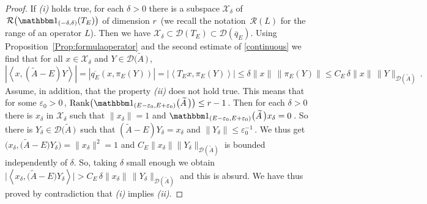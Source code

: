 \documentclass[12pt,reqno]{amsart}
\newcommand{\innerproduct}[2]{\left\langle #1, #2 \right\rangle}
\renewcommand{\(}{\left(}
\renewcommand{\)}{\right)}
\begin{document}
\begin{proof}
If {\it (i)} holds true, for each $\delta>0$ there is a subspace $\mathcal X_\delta$ of $\,{\mathcal R}\big({\mathbbm 1}_{(-\delta,\delta)}(T_E)\big)$ of dimension $r\,$ (we recall the notation $\,{\mathcal R}(L)$ for the range of an operator $L$). Then we have $\mathcal X_\delta\subset \mathcal D(T_E)\subset \mathcal D(\overline{q}_E)$. Using Proposition~\ref{Prop:formulaoperator} and the second estimate of \eqref{continuous} we find that for all $x\in \mathcal X_\delta$ and $Y\in \mathcal D\big(\widetilde A\,\big)\,$,
\[ \left|\innerproduct{x}{(\widetilde A-E)Y}\right|=\left|\overline{q_E}(x,\pi_E(Y))\right|=\left|\innerproduct{T_E x}{\pi_E(Y)}\right|\le \delta\|x\|\,\| \pi_E(Y)\|\le C_E\,\delta\|x\|\,\| Y\|_{\mathcal D(\widetilde A)}\,.\]
Assume, in addition, that the property {\it (ii)} does not hold true. This means that for some $\varepsilon_0>0\,$, $\mathrm{Rank}\big({\mathbbm 1}_{(E-\varepsilon_0,E+\varepsilon_0)}\big(\widetilde A\,\big)\big) \le r-1\,$. Then for each $\delta>0$ there is $x_\delta$ in $\mathcal X_\delta$ such that $\|x_\delta\|=1$ and ${\mathbbm 1}_{(E-\varepsilon_0,E+\varepsilon_0)}\big(\widetilde A\,\big) x_\delta=0\,$. So there is $Y_\delta\in \mathcal D\big(\widetilde A\,\big)\,$ such that $(\widetilde A - E ) Y_\delta = x_\delta$ and
$\| Y_\delta \| \le \varepsilon_0^{-1}\,$. We thus get $\big(x_\delta,\big(\widetilde A-E\big)Y_\delta\big)=\|x_\delta\|^2=1$ and $C_E\|x_\delta\| \| Y_\delta\|_{\mathcal D(\widetilde A)}$ is bounded independently of $\delta$. So, taking $\delta$ small enough we obtain $\big|\innerproduct{x_\delta}{\big(\widetilde A-E\big)Y_\delta}\big| > C_E\,\delta\|x_\delta\|\,\| Y_\delta\|_{\mathcal D(\widetilde A)}$ and this is absurd. We have thus proved by contradiction that {\it (i)} implies {\it (ii)}.\smallskip


\end{proof}
\end{document}
